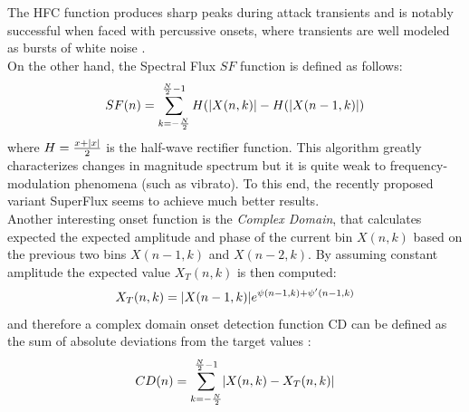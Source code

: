 The HFC function produces sharp peaks during attack transients and is notably successful when faced with percussive onsets, where transients are well modeled as bursts of white noise \cite{bello05}.\\
On the other hand, the Spectral Flux $SF$ function is defined as follows:
\begin{equation}
SF(n) = \sum\limits_{k=-\frac{N}{2}}^{\frac{N}{2}-1} H(\lvert X(n, k)\rvert - H(\lvert X(n - 1, k)\rvert)
\end{equation}
where $H = \frac{x + \lvert x\rvert}{2}$ is the half-wave rectifier function. This algorithm greatly characterizes changes in magnitude spectrum but it is quite weak to frequency-modulation phenomena (such as vibrato). To this end, the recently proposed variant SuperFlux \cite{bock13} seems to achieve much better results. \\
Another interesting onset function is the \textit{Complex Domain}, that calculates expected the expected amplitude and phase of the current bin $X(n, k)$ based on the previous two bins $X(n - 1, k)$ and $X(n -2, k)$. By assuming constant amplitude the expected value $X_T(n, k)$ is then computed:
\begin{equation}
X_T(n, k) = \lvert X(n - 1, k)\rvert e^{\psi (n - 1, k) + \psi ' (n - 1, k)} 
\end{equation}
and therefore a complex domain onset detection function CD can be defined as the sum of absolute deviations from the target values \cite{dixon06}:
\begin{equation}
CD(n) = \sum\limits_{k=-\frac{N}{2}}^{\frac{N}{2}-1} \lvert X(n, k)-X_T(n,k)\rvert
\end{equation}

